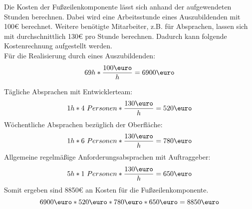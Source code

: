 Die Kosten der Fußzeilenkomponente lässt sich anhand der aufgewendeten Stunden berechnen.
Dabei wird eine Arbeitsstunde eines Auszubildenden mit 100€ berechnet. Weitere benötigte Mitarbeiter, z.B. für Absprachen, lassen sich mit durchschnittlich 130€ pro Stunde berechnen. 
Dadurch kann folgende Kostenrechnung aufgestellt werden.\\
Für die Realisierung durch eines Auszubildenden: \\
\begin{equation}
	69h * \frac{100\mbox{\euro}}{h} = 6900\mbox{\euro} \\
\end{equation}

Tägliche Absprachen mit Entwicklerteam: \\
\begin{equation}
	1h * 4\ Personen * \frac{130\mbox{\euro}}{h} = 520\mbox{\euro} \\
\end{equation}
Wöchentliche Absprachen bezüglich der Oberfläche:  \\
\begin{equation}
	1h * 6\ Personen * \frac{130\mbox{\euro}}{h} = 780\mbox{\euro} \\
\end{equation}
Allgemeine regelmäßige Anforderungsabsprachen mit Auftraggeber:  \\
\begin{equation}
	5h * 1\ Personen * \frac{130\mbox{\euro}}{h} = 650\mbox{\euro} \\
\end{equation}
Somit ergeben sind 8850€ an Kosten für die Fußzeilenkomponente.
\begin{equation}
	6900\mbox{\euro} * 520\mbox{\euro} * 780\mbox{\euro} * 650\mbox{\euro}  =  8850\mbox{\euro}  \\
\end{equation}
